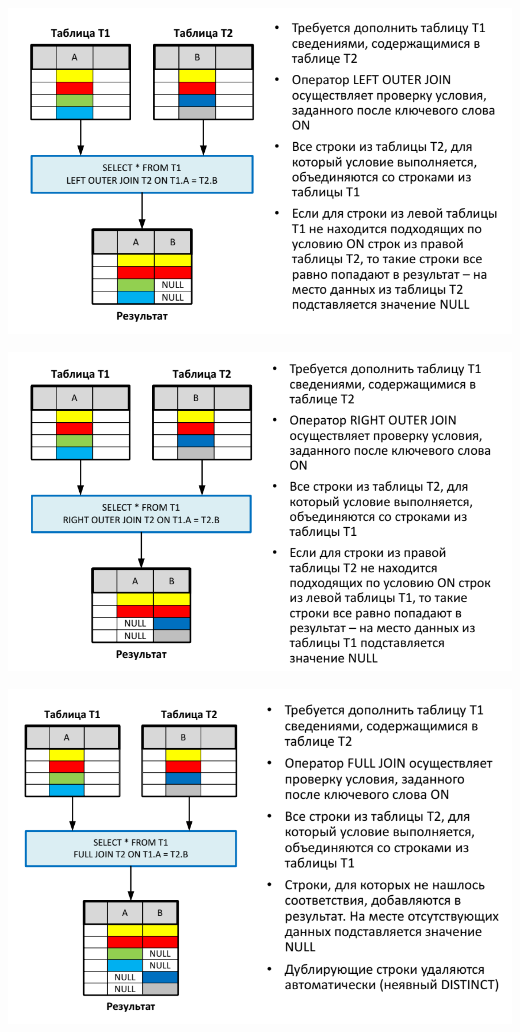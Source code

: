 \documentclass{beamer}
\begin{document}
\begin{frame}
\begin{center}
\includegraphics[scale=0.5]{images/cs-04.png}
\end{center}
\end{frame} 

\begin{frame}
\begin{center}
\includegraphics[scale=0.5]{images/cs-05.png}
\end{center}
\end{frame} 

\begin{frame}
\begin{center}
\includegraphics[scale=0.5]{images/cs-06.png}
\end{center}
\end{frame} 
\end{document}
